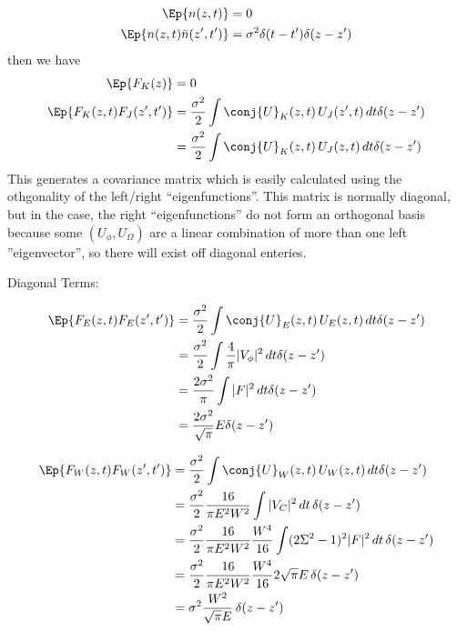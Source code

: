 \begin{equation}
\begin{split}
\Ep{n(z,t)} &= 0\\
\Ep{n(z,t)\bar{n}(z',t')} &= \sigma^2 \delta(t-t')\delta(z-z')
\end{split}
\end{equation}
then we have
\begin{equation}
\begin{split}
\Ep{F_K(z)} &=  0 \\
\Ep{F_K(z,t) F_J(z',t')} &=  \frac{\sigma^2}{2} \int \conj{U}_K(z,t)\, U_J(z',t) \,dt \delta(z-z')\\
&=  \frac{\sigma^2}{2} \int \conj{U}_K(z,t)\, U_J(z,t) \,dt \delta(z-z')\\
\end{split}
\end{equation}
This generates a covariance matrix which is easily calculated using the othgonality of the left/right ``eigenfunctions''.  This matrix is normally diagonal, but 
in the case, the right ``eigenfunctions'' do not form an orthogonal basis because some $(U_{\phi},U_\Omega)$
are a linear combination of more than one left ''eigenvector'', so there will exist off 
diagonal enteries.


Diagonal Terms:

\begin{equation}
\begin{split}
\Ep{F_E(z,t) F_E(z',t')} &= \frac{\sigma^2}{2} \int \conj{U}_E(z,t)\, U_E(z,t) \,dt \delta(z-z')\\
&= \frac{\sigma^2}{2} \int \frac{4}{\pi} |V_\phi|^2 \,dt \delta(z-z')\\
&= \frac{2\sigma^2}{\pi} \int |F|^2 \,dt \delta(z-z')\\
&= \frac{2\sigma^2}{\sqrt{\pi} } E\delta(z-z')\\
\end{split}
\end{equation}

\begin{equation}
\begin{split}
\Ep{F_W(z,t) F_W(z',t')} &= \frac{\sigma^2}{2} \int \conj{U}_W(z,t)\, U_W(z,t) \,dt \delta(z-z') \\
&= \frac{\sigma^2}{2}\frac{16}{ \pi E^2 W^2 } \int |V_{C}|^2 \,dt \, \delta(z-z')\\
&= \frac{\sigma^2}{2}\frac{16}{ \pi E^2 W^2 } \frac{W^4}{16} \int(2\Sigma^2-1)^2 |F|^2 \,dt \, \delta(z-z')\\
&= \frac{\sigma^2}{2}\frac{16}{ \pi E^2 W^2 } \frac{W^4}{16} 2\sqrt{\pi}E \, \delta(z-z')\\
&= \sigma^2\frac{W^2}{\sqrt{\pi} E } \, \delta(z-z')\\
\end{split}
\end{equation}

